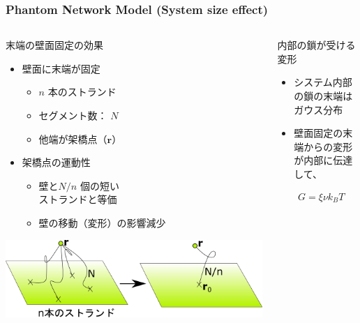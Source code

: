\documentclass[aspectratio=169,11pt, dvipdfmx]{beamer}
\begin{document}
\begin{frame}
	\frametitle{Phantom Network Model (System size effect)}
		\begin{columns}[totalwidth=1\textwidth]
				\begin{block}{末端の壁面固定の効果}
				\begin{itemize}
					\item 壁面に末端が固定
						\begin{itemize}
							\item $n$ 本のストランド
							\item セグメント数： $N$
							\item 他端が架橋点（$\bm{r}$）
						\end{itemize}
					\item 架橋点の運動性
						\begin{itemize}
							\item 壁と$N/n$ 個の短い\\ストランドと等価
							\item 壁の移動（変形）の影響減少
						\end{itemize}
				\end{itemize}
				\begin{center}
					\includegraphics[width=.8\textwidth]{phantom-1.png}
				\end{center}
				\end{block}
				\begin{exampleblock}{内部の鎖が受ける変形}
					\begin{itemize}
						\item システム内部の鎖の末端はガウス分布
						\item 壁面固定の末端からの変形が内部に伝達して、
					\end{itemize}
					\scriptsize
					\begin{align*}
						&G=\xi \nu k_BT \\

\end{align*}
\end{exampleblock}
\end{columns}
\end{frame}
\end{document}
